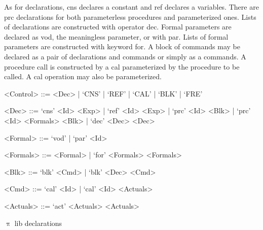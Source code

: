 \documentclass[a4paper,openany]{book}
\begin{document}
As for declarations, cns declares a constant and ref declares a variables. There are prc declarations for both parameterless procedures and parameterized ones. Lists of declarations are constructed with operator dec. Formal parameters are declared as vod, the meaningless parameter, or with par. Lists of formal parameters are constructed with keyword for. A block of commands may be declared as a pair of declarations and commands or simply as a commands. A procedure call is constructed by a cal parameterized by the procedure to be called. A cal operation may also be parameterized. 

%
%
\begin{Grammar}
\begin{grammar}
<Control> ::= <Dec> | `CNS' | `REF' | `CAL' | `BLK' | `FRE'

<Dec> ::=  `cns' <Id> <Exp> | `ref' <Id> <Exp> | `prc' <Id> <Blk> | `prc' <Id> <Formals> <Blk> | `dec' <Dec> <Dec>

<Formal> ::= `vod' | `par' <Id> 

<Formals> ::= <Formal> | `for' <Formals> <Formals>  

<Blk> ::= `blk' <Cmd> | `blk' <Dec> <Cmd> 

<Cmd> ::= `cal' <Id> | `cal' <Id> <Actuals>

<Actuals> ::= `act' <Actuals> <Actuals>
%
%
%
\end{grammar}
\caption{$\uppi$ lib declarations}
\label{grm:uppi-lib-dec}
\end{Grammar}
\end{document}

